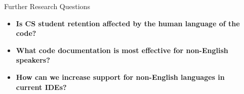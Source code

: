 \documentclass[final]{beamer}
\newlength{\sepwidth}
\newlength{\colwidth}
\newcommand{\separatorcolumn}{\begin{column}{\sepwidth}\end{column}}
\begin{document}
\begin{frame}[t]
\begin{columns}[t]
\begin{column}{\colwidth}
  \begin{alertblock}{Further Research Questions}
    \vspace{4mm}
    \begin{itemize}
      \item \textbf{Is CS student retention affected by the human language of the code?}
      \item \textbf{What code documentation is most effective for non-English speakers?}
      \item \textbf{How can we increase support for non-English languages in current IDEs?} %
    \end{itemize}
  \end{alertblock}

\end{column}

\separatorcolumn
\end{columns}
\end{frame}
\end{document}
